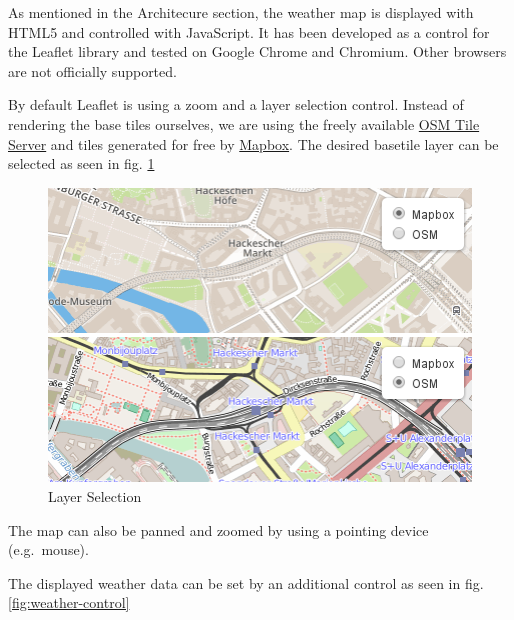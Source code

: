 \documentclass[paper=a4, fontsize=11pt]{scrartcl} %
\numberwithin{equation}{section} %
\numberwithin{figure}{section} %
\numberwithin{table}{section} %
\begin{document}
As mentioned in the Architecure section, the weather map is displayed
with HTML5 and controlled with JavaScript. It has been developed as a
control for the Leaflet library and tested on Google Chrome and
Chromium. Other browsers are not officially supported.

By default Leaflet is using a zoom and a layer selection control.
Instead of rendering the base tiles ourselves, we are using the freely
available
\href{http://wiki.openstreetmap.org/wiki/Tile_usage_policy}{OSM Tile
Server} and tiles generated for free by
\href{https://www.mapbox.com/}{Mapbox}. The desired basetile layer can
be selected as seen in fig. \ref{fig:layer-selection}

\begin{figure}[htbp]
\includegraphics[width=1\textwidth]{pictures/screenshot-baselayer.png}
\caption{Layer Selection}
\label{fig:layer-selection}
\end{figure}

\newpage
The map can also be panned and zoomed by using a pointing device
(e.g.~mouse).

The displayed weather data can be set by an additional control as seen
in fig. \ref{fig:weather-control}
\end{document}
